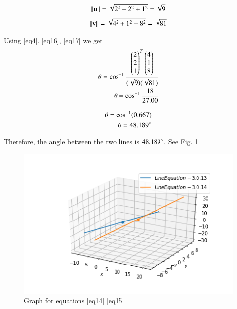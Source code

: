 \documentclass[journal,12pt,twocolumn]{IEEEtran}
\begin{document}
\begin{enumerate}
\begin{align}\label{eq16}
	\left\lVert\mathbf{u}\right\rVert =\sqrt{2^{2}+2^{2}+1^{2}} =\sqrt{9}
\end{align}
\begin{align}\label{eq17}
	\left\lVert\mathbf{v}\right\rVert =\sqrt{4^{2}+1^{2}+8^{2}} =\sqrt{81}
\end{align}

Using \ref{eq4}, \ref{eq16}, \ref{eq17} we get
\begin{align}
	\theta = \cos ^{-1}\frac{\begin{pmatrix}2\\2\\1\end{pmatrix}^{T}\begin{pmatrix}4\\1\\8\end{pmatrix}}{(\sqrt{9})(\sqrt{81})} 
	\\
	\theta = \cos ^{-1}\frac{18}{27.00}
\end{align}

\begin{align}
	\theta = \cos ^{-1} (0.667)
	\\
	\theta = 48.189\degree
\end{align}

Therefore, the angle between the two lines is $48.189\degree$. See Fig. \ref{fig:line_equation_2}


\begin{figure}
	\centering
	\includegraphics[width=\columnwidth]{./codes/figs/Line_interest_2.png}
	\caption{Graph for equations \ref{eq14} \ref{eq15}}
	\label{fig:line_equation_2}
\end{figure}
\end{enumerate}

    
\end{document}
